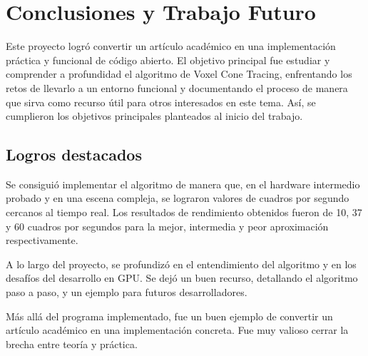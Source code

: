 \graphicspath{{chapters/6_conclusión/figures/}}



\chapter{Conclusiones y Trabajo Futuro}\label{chap:conclusions}

Este proyecto logró convertir un artículo académico en una implementación práctica y funcional de código abierto.
El objetivo principal fue estudiar y comprender a profundidad el algoritmo de Voxel Cone Tracing, enfrentando los retos de llevarlo a un entorno funcional y documentando el proceso de manera que sirva como recurso útil para otros interesados en este tema.
Así, se cumplieron los objetivos principales planteados al inicio del trabajo.

\section{Logros destacados}

Se consiguió implementar el algoritmo de manera que, en el hardware intermedio probado y en una escena compleja, se lograron valores de cuadros por segundo cercanos al tiempo real.
Los resultados de rendimiento obtenidos fueron de 10, 37 y 60 cuadros por segundos para la mejor, intermedia y peor aproximación respectivamente.

A lo largo del proyecto, se profundizó en el entendimiento del algoritmo y en los desafíos del desarrollo en GPU.
Se dejó un buen recurso, detallando el algoritmo paso a paso, y un ejemplo para futuros desarrolladores.

Más allá del programa implementado, fue un buen ejemplo de convertir un artículo académico en una implementación concreta.
Fue muy valioso cerrar la brecha entre teoría y práctica.

